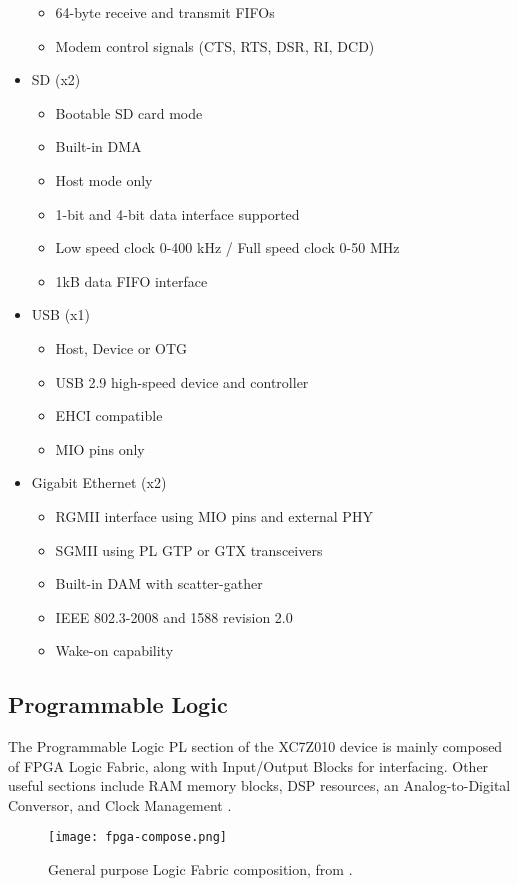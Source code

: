 \begin{itemize}
\begin{itemize}
		\item 64-byte receive and transmit FIFOs
		\item Modem control signals (CTS, RTS, DSR, RI, DCD)
	\end{itemize}
	\item SD (x2)
	\begin{itemize}
		\item Bootable SD card mode
		\item Built-in DMA
		\item Host mode only
		\item 1-bit and 4-bit data interface supported
		\item Low speed clock 0-400 kHz / Full speed clock 0-50 MHz
		\item 1kB data FIFO interface
	\end{itemize}
	\item USB (x1)
	\begin{itemize}
		\item Host, Device or OTG
		\item USB 2.9 high-speed device and controller
		\item EHCI compatible
		\item MIO pins only
	\end{itemize}
	\item Gigabit Ethernet (x2)
	\begin{itemize}
		\item RGMII interface using MIO pins and external PHY
		\item SGMII using PL GTP or GTX transceivers
		\item Built-in DAM with scatter-gather
		\item IEEE 802.3-2008 and 1588 revision 2.0
		\item Wake-on capability
	\end{itemize}
\end{itemize}

\subsection{Programmable Logic}

The Programmable Logic PL section of the XC7Z010 device is mainly composed of FPGA Logic Fabric,
along with Input/Output Blocks for interfacing. Other useful sections include RAM memory blocks, DSP
resources, an Analog-to-Digital Conversor, and Clock Management \cite[p.~23]{Crokett2014}.

\begin{figure}[htp]
	\centering
	\texttt{[image: fpga-compose.png]}
	\caption{General purpose Logic Fabric composition, from \cite{Crokett2014}.}
	\label{fig:fpga-compose}
\end{figure}


